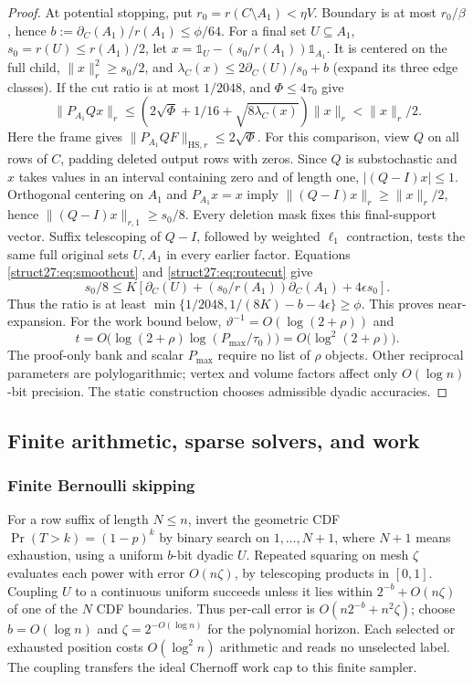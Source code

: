 \documentclass[11pt]{article}
\theoremstyle{remark}
\newcommand{\HS}{\mathrm{HS}}
\newcommand{\norm}[1]{\lVert#1\rVert}
\newcommand{\oone}{\mathds{1}}
\begin{document}
\begin{proof}
At potential stopping, put $r_0=r(C\setminus A_1)<\eta V$.
Boundary is at most $r_0/\beta$, hence $b:=\partial_C(A_1)/r(A_1)\le\phi/64$.
For a final set $U\subseteq A_1$, $s_0=r(U)\le r(A_1)/2$, let
$x=\oone_U-(s_0/r(A_1))\oone_{A_1}$.
It is centered on the full child, $\norm{x}_r^2\ge s_0/2$, and
$\lambda_C(x)\le2\partial_C(U)/s_0+b$ (expand its three edge classes).
If the cut ratio is at most $1/2048$,  and
$\Phi\le4\tau_0$ give
\[
 \norm{P_{A_1}Qx}_r
 \le(2\sqrt\Phi+1/16+\sqrt{8\lambda_C(x)})\norm{x}_r
 <\norm{x}_r/2.
\]
Here the frame gives $\norm{P_{A_1}QF}_{\HS,r}\le2\sqrt\Phi$.
For this comparison, view $Q$ on all rows of $C$, padding deleted output rows
with zeros.
Since $Q$ is substochastic and $x$ takes values in an interval containing zero
and of length one, $|(Q-I)x|\le1$.
Orthogonal centering on $A_1$ and $P_{A_1}x=x$ imply
$\norm{(Q-I)x}_r\ge\norm{x}_r/2$, hence $\norm{(Q-I)x}_{r,1}\ge s_0/8$.
Every deletion mask fixes this final-support vector.
Suffix telescoping of $Q-I$, followed by weighted $\ell_1$ contraction, tests
the same full original sets $U,A_1$ in every earlier factor.
Equations \eqref{struct27:eq:smoothcut} and \eqref{struct27:eq:routecut} give
\[
 s_0/8\le K[\partial_C(U)+(s_0/r(A_1))\partial_C(A_1)+4\epsilon s_0].
\]
Thus the ratio is at least $\min\{1/2048,1/(8K)-b-4\epsilon\}\ge\phi$.
This proves near-expansion.
For the work bound below, $\vartheta^{-1}=O(\log(2+\rho))$ and
\[
 t=O\bigl(\log(2+\rho)\log(P_{\max}/\tau_0)\bigr)
   =O\bigl(\log^2(2+\rho)\bigr).
\]
The proof-only bank and scalar $P_{\max}$ require no list of $\rho$ objects.
Other reciprocal parameters are polylogarithmic; vertex and volume factors
affect only $O(\log n)$-bit precision.
The static construction chooses admissible dyadic accuracies.
\end{proof}

\subsection{Finite arithmetic, sparse solvers, and work}\label{struct27:sec:finite}

\subsubsection{Finite Bernoulli skipping}\label{struct27:sec:skipping} For a row
suffix of length $N\le n$, invert the geometric CDF $\Pr(T>k)=(1-p)^k$ by binary
search on $1,\ldots,N+1$, where $N+1$ means exhaustion, using a uniform $b$-bit
dyadic $U$.
Repeated squaring on mesh $\zeta$ evaluates each power with error $O(n\zeta)$,
by telescoping products in $[0,1]$.
Coupling $U$ to a continuous uniform succeeds unless it lies within
$2^{-b}+O(n\zeta)$ of one of the $N$ CDF boundaries.
Thus per-call error is $O(n2^{-b}+n^2\zeta)$; choose $b=O(\log n)$ and
$\zeta=2^{-O(\log n)}$ for the polynomial horizon.
Each selected or exhausted position costs $O(\log^2 n)$ arithmetic and reads no
unselected label.
The coupling transfers the ideal Chernoff work cap to this finite sampler.
\end{document}
